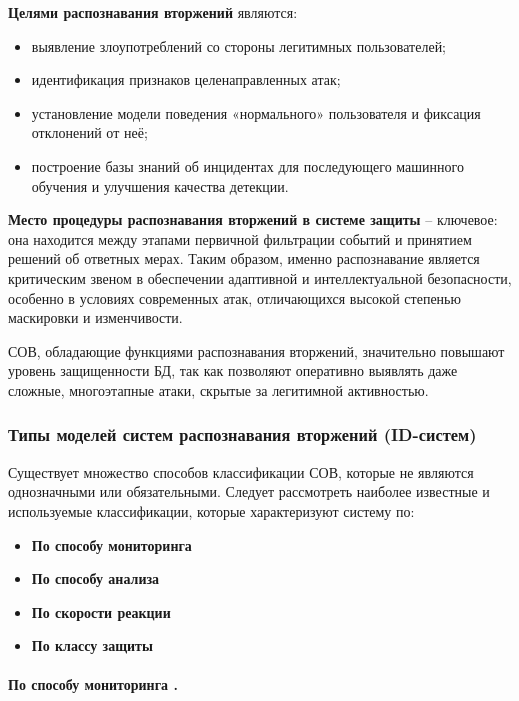 \textbf{Целями распознавания вторжений} являются:
\begin{itemize}
    \item выявление злоупотреблений со стороны легитимных пользователей;
    \item идентификация признаков целенаправленных атак;
    \item установление модели поведения «нормального» пользователя и фиксация отклонений от неё;
    \item построение базы знаний об инцидентах для последующего машинного обучения и улучшения качества детекции.
\end{itemize}

\textbf{Место процедуры распознавания вторжений в системе защиты} -- ключевое: она находится между этапами первичной фильтрации событий и принятием решений об ответных мерах. Таким образом, именно распознавание является критическим звеном в обеспечении адаптивной и интеллектуальной безопасности, особенно в условиях современных атак, отличающихся высокой степенью маскировки и изменчивости.

СОВ, обладающие функциями распознавания вторжений, значительно повышают уровень защищенности БД, так как позволяют оперативно выявлять даже сложные, многоэтапные атаки, скрытые за легитимной активностью.

\subsubsection{Типы моделей систем распознавания вторжений (ID-систем)}

Существует множество способов классификации СОВ, которые не являются однозначными или
обязательными. Следует рассмотреть наиболее известные и используемые классификации,
которые характеризуют систему по:
\begin{itemize}
	\item \textbf{По способу мониторинга}

	\item \textbf{По способу анализа}

	\item \textbf{По скорости реакции}

	\item \textbf{По классу защиты}
\end{itemize}

\paragraph*{По способу мониторинга \cite{kasperskyIDS}.}

